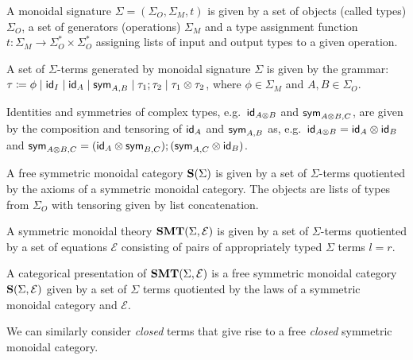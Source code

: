 \begin{definition}
	A monoidal signature $\Sigma = (\Sigma_{O}, \Sigma_{M}, t)$ is given by a set of objects (called types) $\Sigma_{O}$, a set of generators (operations) $\Sigma_{M}$ and a type assignment function $t\colon \Sigma_{M} \to \Sigma_{O}^{*} \times \Sigma_{O}^{*}$ assigning lists of input and output types to a given operation.
\end{definition}
\begin{definition}
	A set of $\Sigma$-terms generated by monoidal signature $\Sigma$ is given by the grammar:
	$\tau \coloneqq \phi \;|\; \textsf{id}_{I} \;|\; \textsf{id}_{A} \;|\; \textsf{sym}_{A,B} \;|\; \tau_{1};\tau_{2} \;|\; \tau_{1} \otimes \tau_{2}$,
	where $\phi \in \Sigma_{M}$ and $A,B \in \Sigma_{O}$.
\end{definition}
Identities and symmetries of complex types, e.g.\ $\textsf{id}_{A \otimes B}$ and $\textsf{sym}_{A \otimes B, C}$, are given by the composition and tensoring of $\textsf{id}_{A}$ and $\textsf{sym}_{A,B}$ as, e.g.\ $\textsf{id}_{A \otimes B} = \textsf{id}_{A} \otimes \textsf{id}_{B}$ and $\textsf{sym}_{A \otimes B, C} = (\textsf{id}_{A} \otimes \textsf{sym}_{B,C});(\textsf{sym}_{A,C} \otimes \textsf{id}_{B})$.
\begin{definition}
	A free symmetric monoidal category $\mathbf{S}(\Sigma)$ is given by a set of $\Sigma$-terms quotiented by the axioms of a symmetric monoidal category.
	The objects are lists of types from $\Sigma_{O}$ with tensoring given by list concatenation.
\end{definition}
\begin{definition}
	A symmetric monoidal theory $\mathbf{SMT}(\Sigma, \mathcal{E})$ is given by a set of $\Sigma$-terms quotiented by a set of equations $\mathcal{E}$ consisting of pairs of appropriately typed $\Sigma$ terms $l = r$.
\end{definition}
\begin{definition}
	A categorical presentation of  $\mathbf{SMT}(\Sigma, \mathcal{E})$ is a free symmetric monoidal category $\mathbf{S}(\Sigma, \mathcal{E})$ given by a set of $\Sigma$ terms quotiented by the laws of a symmetric monoidal category and $\mathcal{E}$.
\end{definition}

We can similarly consider \emph{closed} terms that give rise to a free \emph{closed} symmetric monoidal category.

